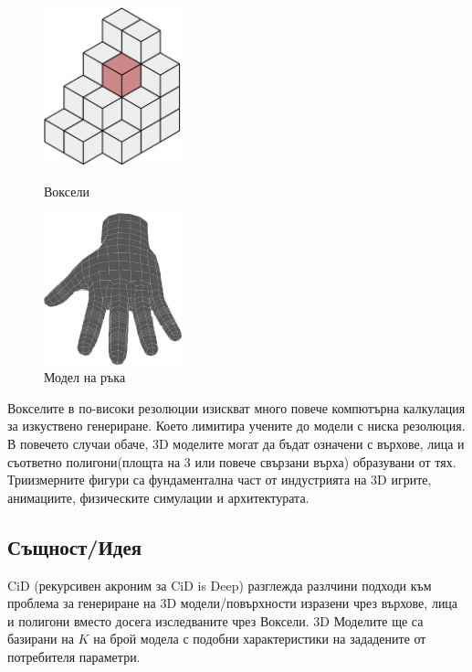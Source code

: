 \begin{figure}
\centering
\parbox{5cm}{
\includegraphics[width=4cm]{voxels.png}
\caption{Воксели}
\label{fig:2figsA}}
\qquad
\begin{minipage}{5cm}
\includegraphics[width=4cm]{hand.png}
\caption{Модел на ръка}
\label{fig:2figsB}
\end{minipage}
\end{figure}

Вокселите в по-високи резолюции изискват много повече компютърна калкулация за изкуствено генериране. Което лимитира учените до модели с ниска резолюция.
В повечето случаи обаче, 3D моделите могат да бъдат означени с върхове, лица и съответно полигони(площта на 3 или повече свързани върха) образувани от тях. Триизмерните фигури са фундаментална част от индустрията на 3D игрите, анимациите, физическите симулации и архитектурата.

\subsection{Същност/Идея}

CiD (рекурсивен акроним за CiD is Deep) разглежда разлчини подходи към проблема за генериране на 3D модели/повърхности изразени чрез върхове, лица и полигони вместо досега изследваните чрез Воксели. 
3D Моделите ще са базирани на $K$ на брой модела с подобни характеристики на зададените от потребителя параметри.

